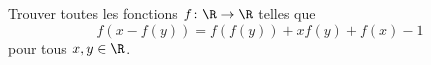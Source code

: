Trouver toutes les fonctions $f \colon \R \to \R$ telles que
\[ f(x - f(y)) = f(f(y)) + x f(y) + f(x) - 1 \]
pour tous $x, y \in \R$.
